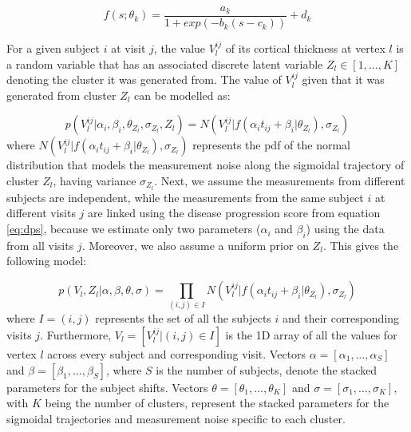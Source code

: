 \documentclass{llncs}
\begin{document}
\begin{equation}
 f(s;\theta_k) = \frac{a_k}{1+exp(-b_k(s-c_k))} + d_k
\end{equation}

For a given subject $i$ at visit $j$, the value $V_l^{ij}$ of its cortical thickness at vertex $l$ is a random variable that has an associated discrete latent variable $Z_l \in [1, \dots, K]$ denoting the cluster it was generated from. The value of $V_l^{ij}$ given that it was generated from cluster $Z_l$ can be modelled as:


\begin{equation}
 p(V_l^{ij} | \alpha_i, \beta_i, \theta_{Z_l}, \sigma_{Z_l}, Z_l) = N(V_l^{ij} | f(\alpha_i t_{ij} + \beta_i | \theta_{Z_l}), \sigma_{Z_l})
\end{equation}
where $N(V_l^{ij} | f(\alpha_i t_{ij} + \beta_i | \theta_{Z_l}), \sigma_{Z_l})$ represents the pdf of the normal distribution that models the measurement noise along the sigmoidal trajectory of cluster $Z_l$, having variance $\sigma_{Z_l}$. Next, we assume the measurements from different subjects are independent, while the measurements from the same subject $i$ at different visits $j$ are linked using the disease progression score from equation \ref{eq:dps}, because we estimate only two parameters ($\alpha_i$ and $\beta_i$) using the data from all visits $j$. Moreover, we also assume a uniform prior on $Z_l$. This gives the following model:

\begin{equation}
 p(V_l, Z_l | \alpha, \beta, \theta, \sigma) = \prod_{(i,j) \in I} N(V_l^{ij} | f(\alpha_i t_{ij} + \beta_i | \theta_{Z_l}), \sigma_{Z_l})
\end{equation}
where $I = {(i,j)}$ represents the set of all the subjects $i$ and their corresponding visits $j$. Furthermore, $V_l = [V_l^{ij} | (i,j) \in I]$ is the 1D array of all the values for vertex $l$ across every subject and corresponding visit. Vectors $\alpha = [\alpha_1, \dots, \alpha_S]$ and $\beta = [\beta_1, \dots, \beta_S]$, where $S$ is the number of subjects, denote the stacked parameters for the subject shifts. Vectors $\theta = [\theta_1, \dots, \theta_K]$ and $\sigma = [\sigma_1, \dots, \sigma_K]$, with $K$ being the number of clusters, represent the stacked parameters for the sigmoidal trajectories and measurement noise specific to each cluster.
\end{document}
